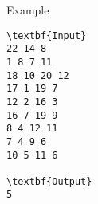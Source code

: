 Example
\begin{verbatim}
\textbf{Input}
22 14 8
1 8 7 11
18 10 20 12
17 1 19 7
12 2 16 3
16 7 19 9
8 4 12 11
7 4 9 6
10 5 11 6

\textbf{Output}
5
\end{verbatim}